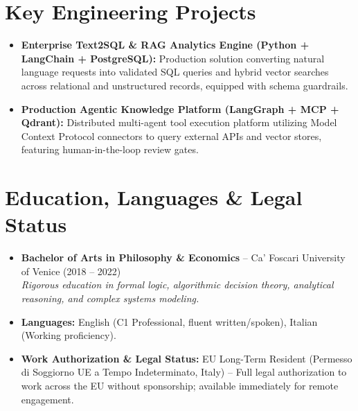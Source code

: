 \documentclass[a4paper,10pt]{article}
\begin{document}
\section{Key Engineering Projects}
\begin{itemize}
  \item \textbf{Enterprise Text2SQL \& RAG Analytics Engine (Python + LangChain + PostgreSQL):} Production solution converting natural language requests into validated SQL queries and hybrid vector searches across relational and unstructured records, equipped with schema guardrails.
  \item \textbf{Production Agentic Knowledge Platform (LangGraph + MCP + Qdrant):} Distributed multi-agent tool execution platform utilizing Model Context Protocol connectors to query external APIs and vector stores, featuring human-in-the-loop review gates.
\end{itemize}

\section{Education, Languages \& Legal Status}
\begin{itemize}
  \item \textbf{Bachelor of Arts in Philosophy \& Economics} -- Ca' Foscari University of Venice (2018 -- 2022) \\
  \textit{Rigorous education in formal logic, algorithmic decision theory, analytical reasoning, and complex systems modeling.}
  \item \textbf{Languages:} English (C1 Professional, fluent written/spoken), Italian (Working proficiency).
  \item \textbf{Work Authorization \& Legal Status:} EU Long-Term Resident (Permesso di Soggiorno UE a Tempo Indeterminato, Italy) -- Full legal authorization to work across the EU without sponsorship; available immediately for remote engagement.
\end{itemize}
\end{document}
